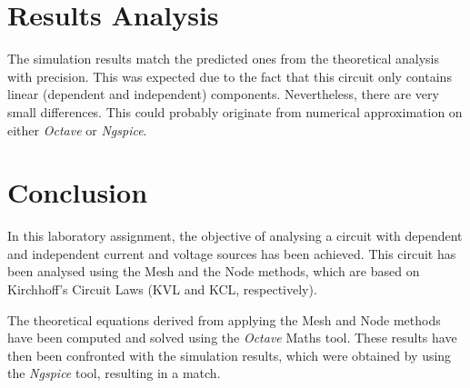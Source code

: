 \section{Results Analysis}
\label{sec:ResultsAnalysis}

\indent

The simulation results match the predicted ones from the theoretical analysis with precision. This was expected due to the fact that this circuit only contains linear (dependent and independent) components.
Nevertheless, there are very small differences. This could probably originate from numerical approximation on either {\em Octave} or {\em Ngspice}.

\pagebreak
\section{Conclusion}
\label{sec:conclusion}

\indent

In this laboratory assignment, the objective of analysing a circuit with dependent and independent current and voltage sources has been achieved. This circuit has been analysed using the Mesh and the Node methods, which are based on Kirchhoff's Circuit Laws (KVL and KCL, respectively). 

The theoretical equations derived from applying the Mesh and Node methods have been computed and solved using the {\em Octave} Maths tool. These results have then been confronted with the simulation results, which were obtained by using the {\em Ngspice} tool, resulting in a match.
